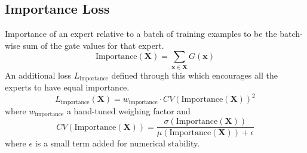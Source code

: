 \documentclass[12pt]{article}
\begin{document}
\subsection{Importance Loss}
Importance of an expert relative to a batch of training examples to be the batch-wise sum of the gate values for that expert. 
\begin{equation}
\text{Importance}(\mathbf{X}) = \sum_{\mathbf{x\in X}}G(\mathbf{x})
\end{equation}
An additional loss $L_{\text{importance}}$ defined through this which encourages all the experts to have equal importance. 
\begin{equation}
L_{\text{importance}}(\mathbf{X}) = w_{\text{importance}}\cdot CV(\text{Importance}(\mathbf{X}))^2
\end{equation}
where $w_{\text{importance}}$ a hand-tuned weighing factor and 
\begin{equation}
CV(\text{Importance}(\mathbf{X})) = \frac{\sigma(\text{Importance}(\mathbf{X}))}{\mu(\text{Importance}(\mathbf{X}))+\epsilon}
\end{equation}
where $\epsilon$ is a small term added for numerical stability.
\end{document}

